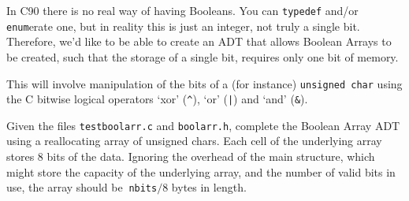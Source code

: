
In C90 there is no real way of having Booleans.
You can \verb^typedef^ and/or \verb^enum^erate one, but in reality this is
just an integer, not truly a single bit.
Therefore, we'd like to be able to create an ADT that allows Boolean Arrays
to be created, such that the storage of a single bit, requires only one bit of memory.

\noindent
This will involve manipulation of the bits of a (for instance) \verb^unsigned char^
using the C bitwise logical operators `xor' (\verb#^#), `or' (\verb^|^) and `and' (\verb^&^).

\begin{exercise}
Given the files \verb^testboolarr.c^ and \verb^boolarr.h^, complete the Boolean Array ADT using
a reallocating array of unsigned chars. Each cell of the underlying array stores $8$ bits
of the data. Ignoring the overhead of the main structure, which might store the capacity of the underlying array, and the number of valid bits in use, the array should be $~$\verb^nbits^$/8$ bytes in length.
\end{exercise}
